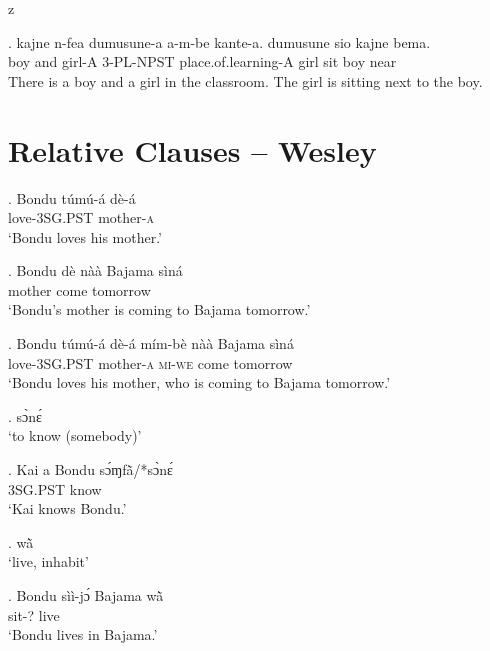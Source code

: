 z   \documentclass{assets/fieldnotes}
\begin{document}
\begin{itemize}
   \exg. kajne n-fea dumusune-a a-m-be kante-a. dumusune sio kajne bema.\\
   boy and girl-A 3-PL-NPST place.of.learning-A girl sit boy near\\
   There is a boy and a girl in the classroom. The girl is sitting next to the boy.



    
\end{itemize}

\section{Relative Clauses -- Wesley}


\exg. Bondu túmú-á dè-á\\
{} love-\textsc{3SG.PST} mother-\textsc{a}\\
`Bondu loves his mother.’\\

\exg. Bondu dè nàà Bajama sìná\\
{} mother come {} tomorrow\\
`Bondu’s mother is coming to Bajama tomorrow.’

\exg. Bondu túmú-á dè-á mím-bè nàà Bajama sìná \\
{} love-\textsc{3SG.PST} mother-\textsc{a} \textsc{mi-we} come {} tomorrow\\
`Bondu loves his mother, who is coming to Bajama tomorrow.’

\ex. sɔ̀nɛ́\\`to know (somebody)’

\exg. Kai a Bondu sɔ́ɱfã̀/*sɔ̀nɛ́\\
{} \textsc{3SG.PST} {} know\\
`Kai knows Bondu.’

\ex. wã̀\\`live, inhabit’

\exg. Bondu sìì-jɔ́ Bajama wã̀\\
{} sit-? {} live\\
`Bondu lives in Bajama.’\\
\end{document}
